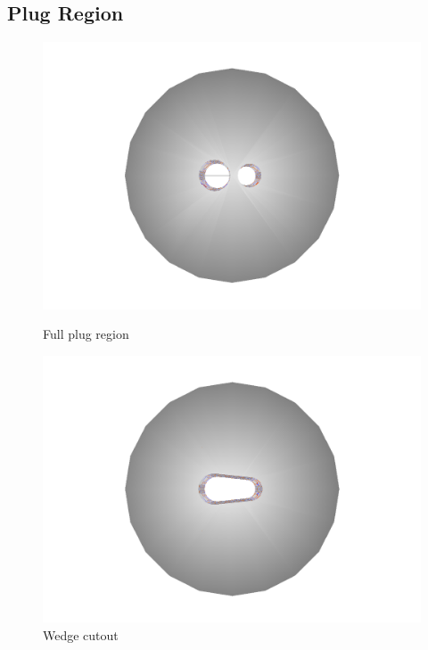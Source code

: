 \documentclass{report}
\begin{document}
            \subsection{Plug Region}
                \begin{figure}[h]
                    \centering
                    \begin{minipage}{0.3\textwidth}
                        \includegraphics[width=\textwidth]{beamcal_plug}
                        \caption{Full plug region}
                        \label{beamcal_plug}
                    \end{minipage}
                    \begin{minipage}{0.3\textwidth}
                        \includegraphics[width=\textwidth]{beamcal_wedge}
                        \caption{Wedge cutout}

\end{minipage}
\end{figure}
\end{document}
